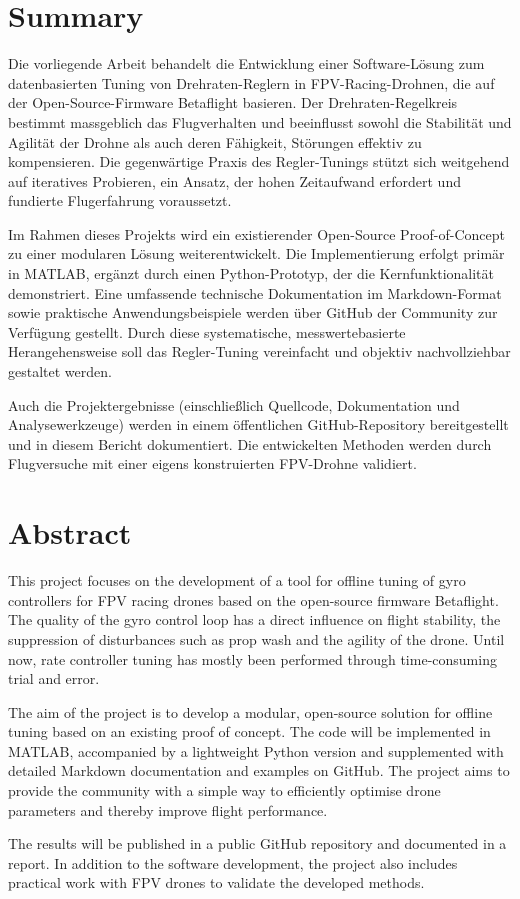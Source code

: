 \documentclass[a4paper,11pt]{scrartcl}
\begin{document}
\begin{titlepage}
	
\end{titlepage}

\section{Summary}
Die vorliegende Arbeit behandelt die Entwicklung einer Software-Lösung zum datenbasierten Tuning von Drehraten-Reglern in FPV-Racing-Drohnen, die auf der Open-Source-Firmware Betaflight basieren. Der Drehraten-Regelkreis bestimmt massgeblich das Flugverhalten und beeinflusst sowohl die Stabilität und Agilität der Drohne als auch deren Fähigkeit, Störungen effektiv zu kompensieren. Die gegenwärtige Praxis des Regler-Tunings stützt sich weitgehend auf iteratives Probieren, ein Ansatz, der hohen Zeitaufwand erfordert und fundierte Flugerfahrung voraussetzt. \par
Im Rahmen dieses Projekts wird ein existierender Open-Source Proof-of-Concept zu einer modularen Lösung weiterentwickelt. Die Implementierung erfolgt primär in MATLAB, ergänzt durch einen Python-Prototyp, der die Kernfunktionalität demonstriert. Eine umfassende technische Dokumentation im Markdown-Format sowie praktische Anwendungsbeispiele werden über GitHub der Community zur Verfügung gestellt. Durch diese systematische, messwertebasierte Herangehensweise soll das Regler-Tuning vereinfacht und objektiv nachvollziehbar gestaltet werden. \par
Auch die Projektergebnisse (einschließlich Quellcode, Dokumentation und Analysewerkzeuge) werden in einem öffentlichen GitHub-Repository bereitgestellt und in diesem Bericht dokumentiert. Die entwickelten Methoden werden durch Flugversuche mit einer eigens konstruierten FPV-Drohne validiert.

\section{Abstract}
This project focuses on the development of a tool for offline tuning of gyro controllers for FPV racing
drones based on the open-source firmware Betaflight. The quality of the gyro control loop has a direct influence
on flight stability, the suppression of disturbances such as prop wash and the agility of the drone. Until now,
rate controller tuning has mostly been performed through time-consuming trial and error. \par
The aim of the project is to develop a modular, open-source solution for offline tuning based on an existing
proof of concept. The code will be implemented in MATLAB, accompanied by a lightweight Python version and
supplemented with detailed Markdown documentation and examples on GitHub. The project aims to provide the
community with a simple way to efficiently optimise drone parameters and thereby improve flight performance.
\par
The results will be published in a public GitHub repository and documented in a report. In addition to the
software development, the project also includes practical work with FPV drones to validate the developed
methods.
\end{document}
